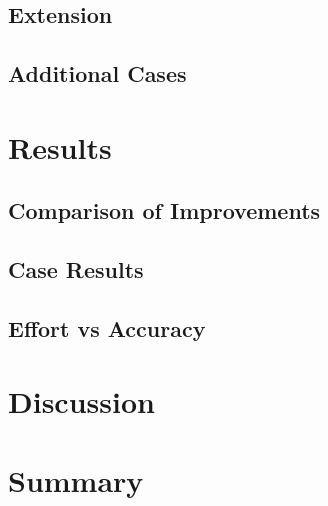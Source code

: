 \documentclass{article}
\begin{document}

\subsection{Extension}


\subsection{Additional Cases}


\section{Results}

\subsection{Comparison of Improvements}

\subsection{Case Results}

\subsection{Effort vs Accuracy}

\section{Discussion}

\section{Summary}
\end{document}
